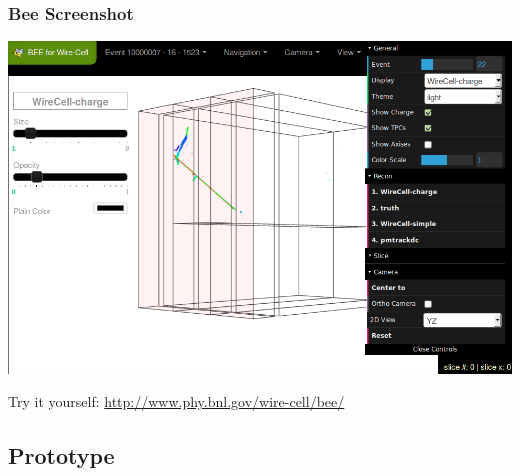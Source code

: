 \begin{frame}
  \frametitle{Bee Screenshot}
  \begin{center}
    \includegraphics[height=0.7\textheight]{bee-full-gui.png}    
  \end{center}
  \begin{center}
    Try it yourself: \url{http://www.phy.bnl.gov/wire-cell/bee/}
  \end{center}
\end{frame}


\subsection{Prototype}

